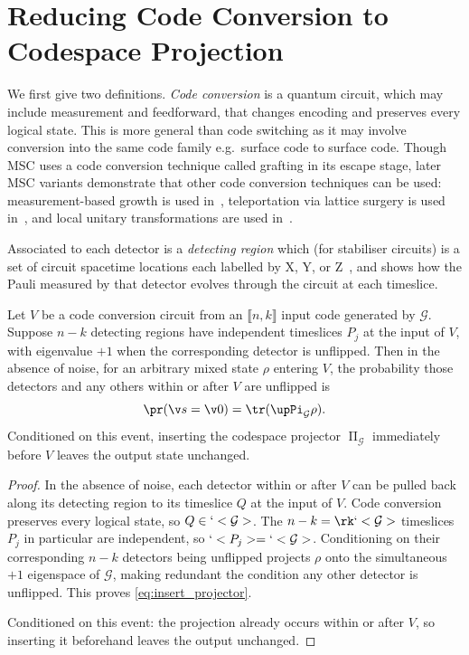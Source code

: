 \section{Reducing Code Conversion to Codespace Projection}
\label{sec:reducing_code_conversion_to_codespace_projection}
We first give two definitions.
\emph{Code conversion} is a quantum circuit,
which may include measurement and feedforward,
that changes encoding and preserves every logical state.
This is more general than code switching
as it may involve conversion into the same code family
e.g.\ surface code to surface code.
Though MSC uses a code conversion technique called grafting in its escape stage,
later MSC variants demonstrate that
other code conversion techniques can be used:
	measurement-based growth is used in~\cite{Sahay2026,Claes2025,Chen2026},
	teleportation via lattice surgery is used in~\cite{Itogawa2025,Hirano2025a,Thorvaldson2026},
	and local unitary transformations are used in~\cite{Itogawa2025,Sahay2026}.

Associated to each detector is a \emph{detecting region} which
(for stabiliser circuits)
is a set of circuit spacetime locations
each labelled by X, Y, or Z~\cite{McEwen2023},
and shows how the Pauli measured by that detector
evolves through the circuit at each timeslice.

\begin{lem}
\label{lem:insert_projector}
Let $V$ be a code conversion circuit
from an $\llbracket n,k\rrbracket$ input code generated by $\mathcal G$.
Suppose $n -k$ detecting regions have
independent timeslices $P_j$ at the input of $V$,
with eigenvalue $+1$ when the corresponding detector is unflipped.
Then in the absence of noise,
for an arbitrary mixed state $\rho$ entering $V$,
the probability those detectors
and any others within or after $V$ are unflipped is
\begin{equation}
	\pr(\v s =\v 0)
	=\tr(\upPi_{\mathcal G} \rho).
	\label{eq:insert_projector}
\end{equation}
Conditioned on this event,
inserting the codespace projector $\upPi_{\mathcal G}$
immediately before $V$ leaves the output state unchanged.
\end{lem}
\begin{proof}
In the absence of noise,
each detector within or after $V$ can be pulled back along its detecting region
to its timeslice $Q$ at the input of $V$.
Code conversion preserves every logical state,
so $Q \in `<\mathcal G>$.
The $n -k =\rk `<\mathcal G>$ timeslices $P_j$ in particular are independent,
so $`<P_j> =`<\mathcal G>$.
Conditioning on their corresponding $n -k$ detectors being unflipped
projects $\rho$ onto the simultaneous $+1$ eigenspace of $\mathcal G$,
making redundant the condition any other detector is unflipped.
This proves \cref{eq:insert_projector}.

Conditioned on this event:
the projection already occurs within or after $V$,
so inserting it beforehand leaves the output unchanged.
\end{proof}